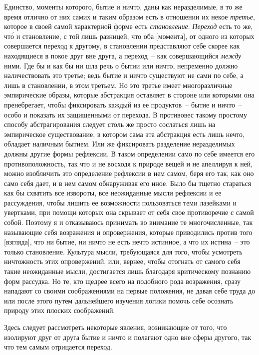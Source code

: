Единство, моменты которого, бытие и ничто, даны как
неразделимые, в то же время отлично от них самих и таким
образом есть в отношении их некое \emph{третье}, которое
в своей самой характерной форме есть \emph{становление}. \emph{Переход}
есть то же, чт\'о и становление, с той лишь разницей,
что оба [момента], от одного из которых совершается переход
к другому, в становлении представляют себе скорее
как находящиеся в покое друг вне друга, а переход~-- как
совершающийся \emph{между} ними. Где бы и как бы ни шла
речь о бытии или ничто, непременно должно наличествовать
это третье; ведь бытие и ничто существуют не сами
по себе, а лишь в становлении, в этом третьем. Но это
третье имеет многоразличные эмпирические образы, которые
абстракция оставляет в стороне или которыми она
пренебрегает, чтобы фиксировать каждый из ее продуктов~--
бытие и ничто~-- особо и показать их защищенными
от перехода. В противовес такому простому способу
абстрагирования следует столь же просто сослаться лишь
на эмпирическое существование, в котором сама эта абстракция
есть лишь нечто, обладает наличным бытием.
Или же фиксировать разделение неразделимых должны
другие формы рефлексии. В таком определении само по
себе имеется его противоположность, так что и не восходя
к природе вещей и не апеллируя к ней, можно изобличить
это определение рефлексии в нем самом, беря его
так, как оно само себя дает, и в нем самом обнаруживая
его иное. Было бы тщетно стараться как бы схватить все
извороты, все неожиданные мысли рефлексии и ее рассуждения,
чтобы лишить ее возможности пользоваться теми
лазейками и увертками, при помощи которых она
скрывает от себя свое противоречие с самой собой. Поэтому
я и отказываюсь принимать во внимание те многочисленные,
так называющие себя возражения и опровержения,
которые приводились против того [взгляда], что
ни бытие, ни ничто не есть нечто истинное, а что их истина~--
это только становление. Культура мысли, требующаяся
для того, чтобы усмотреть ничтожность этих опровержений,
или, вернее, чтобы отогнать от самого себя такие
неожиданные мысли, достигается лишь благодаря критическому
познанию форм рассудка. Но те, кто щедрее всего
на подобного рода возражения, сразу нападают со своими
соображениями на первые положения, не давая себе
труда до или после этого путем дальнейшего изучения
логики помочь себе осознать природу этих плоских соображений.

Здесь следует рассмотреть некоторые явления, возникающие
от того, что изолируют друг от друга бытие и ничто
и полагают одно вне сферы другого, так что тем самым
отрицается переход.


